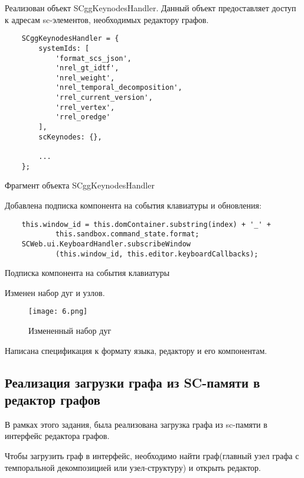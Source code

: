 Реализован объект SCggKeynodesHandler. Данный объект предоставляет доступ к адресам sc-элементов, необходимых редактору графов.

\begin{listing}[H]
  \begin{verbatim}
    SCggKeynodesHandler = {
        systemIds: [
            'format_scs_json',
            'nrel_gt_idtf',
            'nrel_weight',
            'nrel_temporal_decomposition',
            'rrel_current_version',
            'rrel_vertex',
            'rrel_oredge'
        ],
        scKeynodes: {},
        
        ...
    };
  \end{verbatim}
  \caption{Фрагмент объекта SCggKeynodesHandler}
  \label{lst:practice:modelling_example}
\end{listing}

Добавлена подписка компонента на события клавиатуры и обновления:

\begin{listing}[H]
  \begin{verbatim}
    this.window_id = this.domContainer.substring(index) + '_' +
            this.sandbox.command_state.format;
    SCWeb.ui.KeyboardHandler.subscribeWindow
            (this.window_id, this.editor.keyboardCallbacks);
  \end{verbatim}
  \caption{Подписка компонента на события клавиатуры}
  \label{lst:practice:modelling_example}
\end{listing}

Изменен набор дуг и узлов.

\begin{figure}[H]
  \centering
  \texttt{[image: 6.png]}
  \caption{Измененный набор дуг}
  \label{fig:hardware:sdr_pipeline}
\end{figure}

Написана спецификация к формату языка, редактору и его компонентам.

\newpage
\subsection{Реализация загрузки графа из SC-памяти в редактор графов}

В рамках этого задания, была реализована загрузка графа из sc-памяти в интерфейс редактора графов.

Чтобы загрузить граф в интерфейс, необходимо найти граф(главный узел графа с темпоральной декомпозицией или узел-структуру) и открыть редактор.

